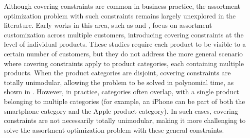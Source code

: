 \documentclass[msom,non-blindrev]{informs3} %
\theoremstyle{definition}
\newcommand{\eg}{\textit{e.g.}}
\begin{document}
Although covering constraints are common in business practice, the assortment optimization problem with such constraints remains largely unexplored in the literature. Early works in this area, such as \cite{barre2023assortment} and \cite{lu2023simple}, focus on assortment customization across multiple customers, introducing covering constraints at the level of individual products. These studies require each product to be visible to a certain number of customers, but they do not address the more general scenario where covering constraints apply to product categories, each containing multiple products. When the product categories are disjoint, covering constraints are totally unimodular, allowing the problem to be solved in polynomial time, as shown in \cite{sumida2021revenue}. However, in practice, categories often overlap, with a single product belonging to multiple categories (for example, an iPhone can be part of both the smartphone category and the Apple product category). In such cases, covering constraints are not necessarily totally unimodular, making it more challenging to solve the assortment optimization problem with these general constraints.





\end{document}
